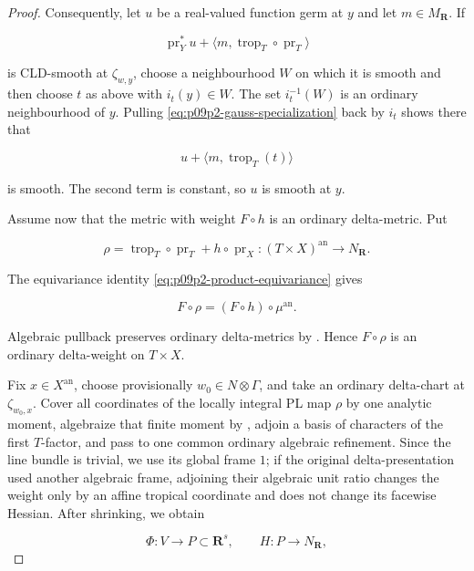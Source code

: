 \begin{proof}
Consequently, let \(u\) be a real-valued function germ at \(y\) and let
\(m\in M_{\mathbf R}\).  If

\begin{equation}
\label{eq:p09p2-gauss-specialization}
 \operatorname{pr}_Y^*u
   +\langle m,\operatorname{trop}_T\circ\operatorname{pr}_T\rangle
\end{equation}

is CLD-smooth at \(\zeta_{w,y}\), choose a neighbourhood \(W\) on which
it is smooth and then choose \(t\) as above with \(i_t(y)\in W\).  The set
\(i_t^{-1}(W)\) is an ordinary neighbourhood of \(y\).  Pulling
\eqref{eq:p09p2-gauss-specialization} back by \(i_t\) shows there that

\[
 u+\langle m,\operatorname{trop}_T(t)\rangle
\]

is smooth.  The second term is constant, so \(u\) is smooth at \(y\).

Assume now that the metric with weight \(F\circ h\) is an ordinary
delta-metric.  Put

\[
 \rho=\operatorname{trop}_T\circ\operatorname{pr}_T
           +h\circ\operatorname{pr}_X
       :(T\times X)^{\mathrm{an}}\longrightarrow N_{\mathbf R}.
\]

The equivariance identity \eqref{eq:p09p2-product-equivariance} gives

\begin{equation}
\label{eq:p09p2-action-pullback-weight}
                         F\circ\rho
                    =(F\circ h)\circ\mu^{\mathrm{an}}.
\end{equation}

Algebraic pullback preserves ordinary delta-metrics by
\cite[Proposition~9.15]{GK17}.  Hence \(F\circ\rho\) is an ordinary
delta-weight on \(T\times X\).

Fix \(x\in X^{\mathrm{an}}\), choose provisionally
\(w_0\in N\otimes\Gamma\), and take an ordinary delta-chart at
\(\zeta_{w_0,x}\).  Cover all coordinates of the locally integral PL map
\(\rho\) by one analytic moment, algebraize that finite moment by
\cite[Proposition~7.2]{Gub16}, adjoin a basis of characters of the first
\(T\)-factor, and pass to one common ordinary algebraic refinement.  Since
the line bundle is trivial, we use its global frame \(1\); if the original
delta-presentation used another algebraic frame, adjoining their algebraic
unit ratio changes the weight only by an affine tropical coordinate and
does not change its facewise Hessian.  After shrinking, we obtain

\[
 \Phi:V\longrightarrow P\subset\mathbf R^s,
 \qquad
 H:P\longrightarrow N_{\mathbf R},
\]


\end{proof}
